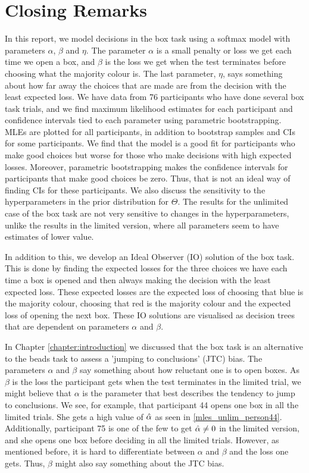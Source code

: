 \chapter{Closing Remarks}
In this report, we model decisions in the box task using a softmax model with parameters $\alpha$, $\beta$ and $\eta$. The parameter $\alpha$ is a small penalty or loss we get each time we open a box, and $\beta$ is the loss we get when the test terminates before choosing what the majority colour is. The last parameter, $\eta$, says something about how far away the choices that are made are from the decision with the least expected loss.
We have data from 76 participants who have done several box task trials, and we find maximum likelihood estimates for each participant and confidence intervals tied to each parameter using parametric bootstrapping. MLEs are plotted for all participants, in addition to bootstrap samples and CIs for some participants. 
We find that the model is a good fit for participants who make good choices but worse for those who make decisions with high expected losses. Moreover, parametric bootstrapping makes the confidence intervals for participants that make good choices be zero. Thus, that is not an ideal way of finding CIs for these participants.
We also discuss the sensitivity to the hyperparameters in the prior distribution for $\Theta$. The results for the unlimited case of the box task are not very sensitive to changes in the hyperparameters, unlike the results in the limited version, where all parameters seem to have estimates of lower value. 

In addition to this, we develop an Ideal Observer (IO) solution of the box task. This is done by finding the expected losses for the three choices we have each time a box is opened and then always making the decision with the least expected loss. These expected losses are the expected loss of choosing that blue is the majority colour, choosing that red is the majority colour and the expected loss of opening the next box. These IO solutions are visualised as decision trees that are dependent on parameters $\alpha$ and $\beta$.

In Chapter \ref{chapter:introduction} we discussed that the box task is an alternative to the beads task to assess a 'jumping to conclusions' (JTC) bias. The parameters $\alpha$ and $\beta$ say something about how reluctant one is to open boxes. As $\beta$ is the loss the participant gets when the test terminates in the limited trial, we might believe that $\alpha$ is the parameter that best describes the tendency to jump to conclusions. We see, for example, that participant 44 opens one box in all the limited trials. She gets a high value of $\hat{\alpha}$ as seen in \eqref{mles_unlim_person44}. Additionally, participant 75 is one of the few to get $\hat{\alpha} \neq 0$ in the limited version, and she opens one box before deciding in all the limited trials. However, as mentioned before, it is hard to differentiate between $\alpha$ and $\beta$ and the loss one gets. Thus, $\beta$ might also say something about the JTC bias. 

